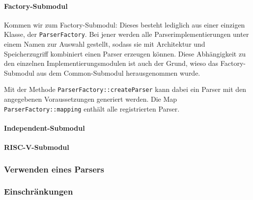 \paragraph{Factory-Submodul}

Kommen wir zum Factory-Submodul: Dieses besteht lediglich aus einer einzigen Klasse, der \texttt{ParserFactory}. Bei jener werden alle Parserimplementierungen unter einem Namen zur Auswahl gestellt, sodass sie mit Architektur und Speicherzugriff kombiniert einen Parser erzeugen können. Diese Abhängigkeit zu den einzelnen Implementierungsmodulen ist auch der Grund, wieso das Factory-Submodul aus dem Common-Submodul herausgenommen wurde.

Mit der Methode \texttt{ParserFactory::createParser} kann dabei ein Parser mit den angegebenen Voraussetzungen generiert werden. Die Map \texttt{ParserFactory::mapping} enthält alle registrierten Parser.

\paragraph{Independent-Submodul}

\paragraph{RISC-V-Submodul}

\subsubsection{Verwenden eines Parsers}

\subsubsection{Einschränkungen}

